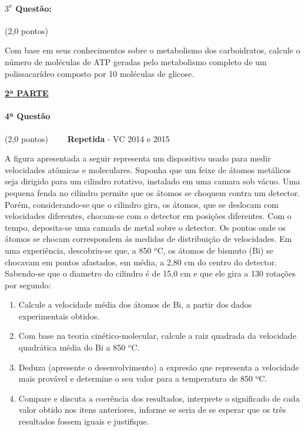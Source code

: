 \documentclass[12pt,a4paper]{article}
\begin{document}
\paragraph{$3^a$ Questão:} (2,0 pontos)

Com base em seus conhecimentos sobre o metabolismo dos carboidratos, calcule o número de moléculas de ATP geradas pelo 
metabolismo completo de um polissacarídeo composto por 10 moléculas de glicose.

\vspace{3cm}

\begin{center}
\underline{\textbf{2ª PARTE}}
\end{center}

\paragraph{4ª Questão} (2,0 pontos) \ \ \ \ \textbf{Repetida} - VC 2014 e 2015

A figura apresentada a seguir representa um dispositivo usado para medir velocidades atômicas e moleculares. Suponha que um feixe de átomos metálicos seja dirigido para um cilindro rotativo, instalado em uma camara sob vácuo. Uma pequena fenda no cilindro permite que os átomos se choquem contra um detector. Porém, considerando-se que o cilindro gira, os átomos, que se deslocam com velocidades diferentes, chocam-se com o detector em posições diferentes. Com o tempo, deposita-se uma camada de metal sobre o detector. Os pontos onde os átomos se chocam correspondem ás medidas de distribuição de velocidades. Em uma experiência, descobriu-se que, a 850 $^o$C, os átomos de bismuto (Bi) se chocavam em pontos afastados, em média, a 2,80 cm do centro do detector. Sabendo-se que o diametro do cilindro é de 15,0 cm e que ele gira a 130 rotações por segundo:

\begin{enumerate}[label=\alph*)]

\item Calcule a velocidade média dos átomos de Bi, a partir dos dados experimentais obtidos.

\item Com base na teoria cinético-molecular, calcule a raiz quadrada da velocidade quadrática média do Bi a 850 $^o$C.

\item Deduza (apresente o desenvolvimento) a expresão que representa a velocidade mais provável e determine o seu valor para a temperatura de 850 ºC.

\item  Compare e discuta a coerência dos resultados, interprete o significado de cada valor obtido nos itens anteriores, informe
se seria de se esperar que os três resultados fossem iguais e justifique.

\end{enumerate}
\end{document}
